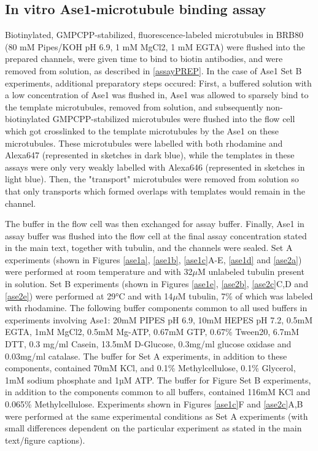 \subsection{In vitro Ase1-microtubule binding assay}
\label{Ase1AssayMethods}
Biotinylated, GMPCPP-stabilized, fluorescence-labeled microtubules in BRB80 (80 mM Pipes/KOH pH 6.9, 1 mM MgCl2, 1 mM EGTA) were flushed into the prepared channels, were given time to bind to biotin antibodies, and were removed from solution, as described in \autoref{assayPREP}. In the case of Ase1 Set B experiments, additional preparatory steps occured: First, a buffered solution with a low concentration of Ase1 was flushed in, Ase1 was allowed to sparsely bind to the template microtubules, removed from solution, and subsequently non-biotinylated GMPCPP-stabilized microtubules were flushed into the flow cell which got crosslinked to the template microtubules by the Ase1 on these microtubules. These microtubules were labelled with both rhodamine and Alexa647 (represented in sketches in dark blue), while the templates in these assays were only very weakly labelled with Alexa646 (represented in sketches in light blue). Then, the "transport" microtubules were removed from solution so that only transports which formed overlaps with templates would remain in the channel. \par 
The buffer in the flow cell was then exchanged for assay buffer. Finally, Ase1 in assay buffer was flushed into the flow cell at the final assay concentration stated in the main text, together with tubulin, and the channels were sealed. Set A experiments (shown in Figures \ref{ase1a}, \ref{ase1b}, \ref{ase1c}A-E, \ref{ase1d} and \ref{ase2a}) were performed at room temperature and with 32$\mu$M unlabeled tubulin present in solution. Set B experiments (shown in Figures \ref{ase1e}, \ref{ase2b}, \ref{ase2c}C,D and \ref{ase2e}) were performed at 29°C and with 14$\mu$M tubulin, 7\% of which was labeled with rhodamine. The following buffer components common to all used buffers in experiments involving Ase1: 20mM PIPES pH 6.9, 10mM HEPES pH 7.2, 0.5mM EGTA, 1mM MgCl2, 0.5mM Mg-ATP, 0.67mM GTP, 0.67\% Tween20, 6.7mM DTT, 0.3 mg/ml Casein, 13.5mM D-Glucose, 0.3mg/ml glucose oxidase and 0.03mg/ml catalase. The buffer for Set A experiments, in addition to these components, contained 70mM KCl, and 0.1\% Methylcellulose, 0.1\% Glycerol, 1mM sodium phosphate and 1µM ATP. The buffer for Figure Set B experiments, in addition to the components common to all buffers, contained 116mM KCl and 0.065\% Methylcellulose. Experiments shown in Figures \ref{ase1c}F and \ref{ase2c}A,B were performed at the same experimental conditions as Set A experiments (with small differences dependent on the particular experiment as stated in the main text/figure captions).

